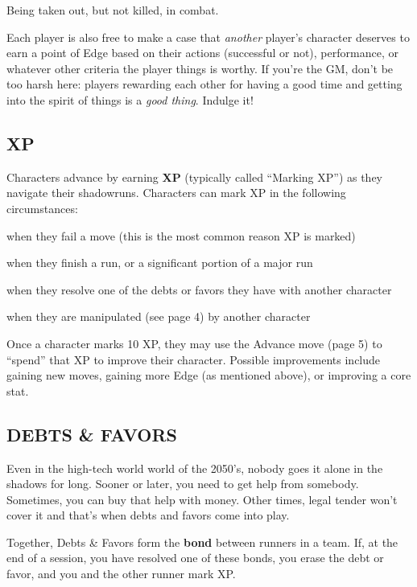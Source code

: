 \documentclass[oneside,10pt]{article}
\begin{document}
\begin{multicols}{2}
\begin{adjustwidth*}{.5cm}{.5cm}
\tcirc{} Being taken out, but not killed, in combat.
\end{adjustwidth*}

Each player is also free to make a case that \textit{another} player’s
character deserves to earn a point of Edge based on their
actions (successful or not), performance, or whatever other
criteria the player things is worthy. If you’re the GM, don’t
be too harsh here: players rewarding each other for having
a good time and getting into the spirit of things is a \textit{good
thing}. Indulge it!

\subsection{XP}
Characters advance by earning \textbf{XP} (typically called “Marking
XP”) as they navigate their shadowruns. Characters can mark
XP in the following circumstances:

\begin{adjustwidth*}{.5cm}{.5cm}
\tcirc{} when they fail a move (this is the most common reason
XP is marked)

\tcirc{} when they finish a run, or a significant portion of a major
run

\tcirc{} when they resolve one of the debts or
favors they have with another character

\tcirc{} when they are manipulated (see page 4) by another
character
\end{adjustwidth*}

Once a character marks 10 XP, they may use the Advance
move (page 5) to “spend” that XP to improve their character.
Possible improvements include gaining new moves, gaining
more Edge (as mentioned above), or improving a core stat.

\subsection{DEBTS \& FAVORS}
Even in the high-tech world world of the 2050’s, nobody
goes it alone in the shadows for long. Sooner or later, you
need to get help from somebody. Sometimes, you can buy
that help with money. Other times, legal tender won’t cover
it and that’s when debts and favors come into
play.

Together, Debts \& Favors form the \textbf{bond} between runners in
a team. If, at the end of a session, you have resolved one of
these bonds, you erase the debt or favor, and you and the
other runner mark XP.


\end{multicols}
\end{document}
